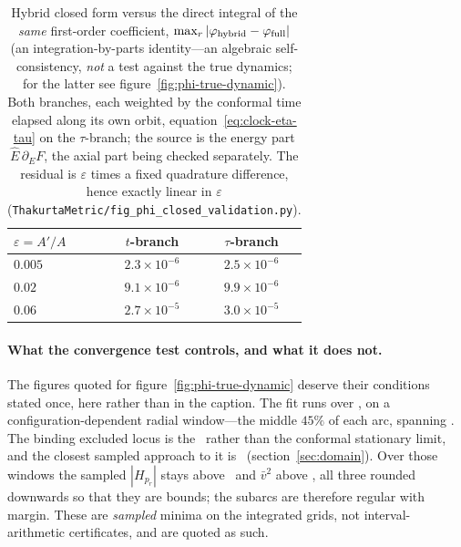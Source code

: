 \documentclass[12pt]{iopart}
\theoremstyle{plain}
\theoremstyle{definition}
\theoremstyle{remark}
\newcommand{\Ehat}{\hat E}
\begin{document}
\begin{table}[htbp]
    \centering
    \caption{Hybrid closed form versus the direct integral of the \emph{same}
    first-order coefficient, $\max_r|\varphi_{\rm hybrid}-\varphi_{\rm full}|$ (an
    integration-by-parts identity---an algebraic self-consistency, \emph{not} a test
    against the true dynamics; for the latter see figure~\ref{fig:phi-true-dynamic}).
    Both branches, each weighted by the conformal time elapsed along its own orbit,
    equation~\eqref{eq:clock-eta-tau} on the $\tau$-branch; the source is the energy
    part $\Ehat\,\partial_E F$, the axial part being checked separately. The residual is
    $\varepsilon$ times a fixed quadrature difference, hence exactly linear in
    $\varepsilon$ (\texttt{ThakurtaMetric/fig\_phi\_closed\_validation.py}).}
    \label{tab:adiab-valid}
    \begin{tabular}{lcc}
        \hline\hline
        $\varepsilon=A'/A$ & $t$-branch & $\tau$-branch\\
        \hline
        $0.005$ & $2.3\times10^{-6}$ & $2.5\times10^{-6}$\\
        $0.02$  & $9.1\times10^{-6}$ & $9.9\times10^{-6}$\\
        $0.06$  & $2.7\times10^{-5}$ & $3.0\times10^{-5}$\\
        \hline\hline
    \end{tabular}
\end{table}

\paragraph{What the convergence test controls, and what it does not.} The
figures quoted for figure~\ref{fig:phi-true-dynamic} deserve their conditions
stated once, here rather than in the caption. The fit runs over
\provEpsWindow, on a configuration-dependent radial window---the middle $45\%$
of each arc, spanning \provFitInterval. The binding excluded locus
is the \provBindingLocus\ rather than the conformal stationary limit, and the
closest sampled approach to it is \provLocusSep\ (section~\ref{sec:domain}). Over
those windows the sampled $|H_{p_r}|$ stays above \provMinHpr\ and $\bar v^2$
above \provMinVbarSq, all three rounded downwards so that they are bounds; the
subarcs are therefore regular with margin. These are \emph{sampled} minima on the
integrated grids, not interval-arithmetic certificates, and are quoted as such.
\end{document}
